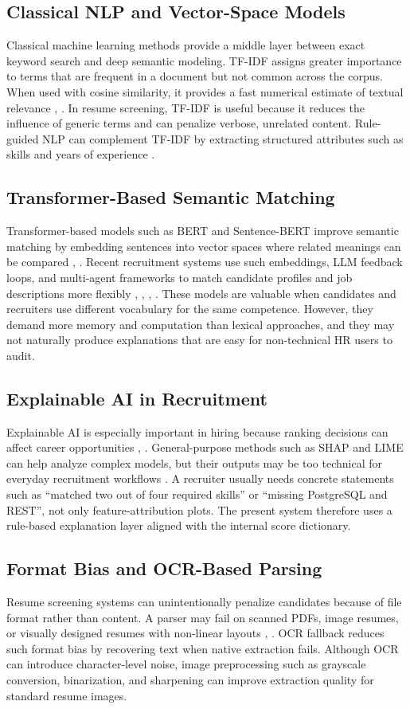 \documentclass[conference]{IEEEtran}
\begin{document}
\subsection{Classical NLP and Vector-Space Models}
Classical machine learning methods provide a middle layer between exact keyword search and deep semantic modeling. TF-IDF assigns greater importance to terms that are frequent in a document but not common across the corpus. When used with cosine similarity, it provides a fast numerical estimate of textual relevance \cite{b7}, \cite{b10}. In resume screening, TF-IDF is useful because it reduces the influence of generic terms and can penalize verbose, unrelated content. Rule-guided NLP can complement TF-IDF by extracting structured attributes such as skills and years of experience \cite{b16}.

\subsection{Transformer-Based Semantic Matching}
Transformer-based models such as BERT and Sentence-BERT improve semantic matching by embedding sentences into vector spaces where related meanings can be compared \cite{b6}, \cite{b12}. Recent recruitment systems use such embeddings, LLM feedback loops, and multi-agent frameworks to match candidate profiles and job descriptions more flexibly \cite{b2}, \cite{b5}, \cite{b11}, \cite{b13}. These models are valuable when candidates and recruiters use different vocabulary for the same competence. However, they demand more memory and computation than lexical approaches, and they may not naturally produce explanations that are easy for non-technical HR users to audit.

\subsection{Explainable AI in Recruitment}
Explainable AI is especially important in hiring because ranking decisions can affect career opportunities \cite{b8}, \cite{b14}. General-purpose methods such as SHAP and LIME can help analyze complex models, but their outputs may be too technical for everyday recruitment workflows \cite{b9}. A recruiter usually needs concrete statements such as ``matched two out of four required skills'' or ``missing PostgreSQL and REST'', not only feature-attribution plots. The present system therefore uses a rule-based explanation layer aligned with the internal score dictionary.

\subsection{Format Bias and OCR-Based Parsing}
Resume screening systems can unintentionally penalize candidates because of file format rather than content. A parser may fail on scanned PDFs, image resumes, or visually designed resumes with non-linear layouts \cite{b7}, \cite{b15}. OCR fallback reduces such format bias by recovering text when native extraction fails. Although OCR can introduce character-level noise, image preprocessing such as grayscale conversion, binarization, and sharpening can improve extraction quality for standard resume images.
\end{document}
